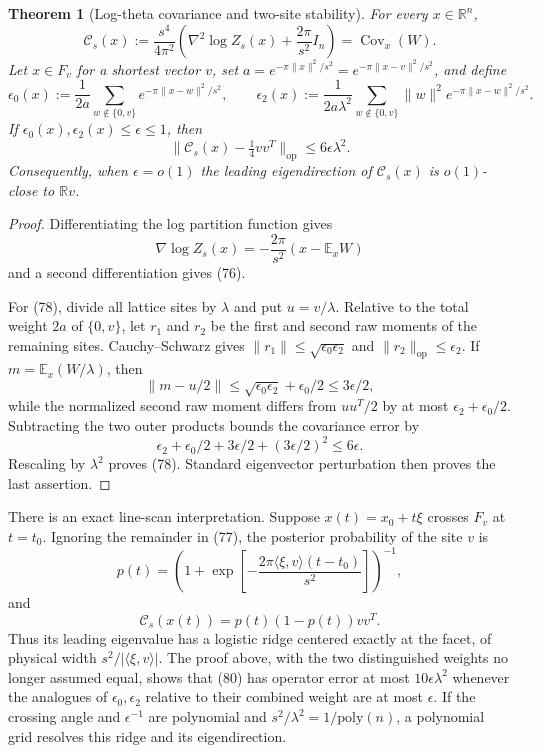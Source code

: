 \documentclass[10pt]{article}
\newtheorem{theorem}{Theorem}[section]
\theoremstyle{definition}
\newcommand{\R}{\mathbb{R}}
\newcommand{\E}{\mathbb{E}}
\newcommand{\op}{\mathrm{op}}
\newcommand{\poly}{\mathrm{poly}}
\newcommand{\ip}[2]{\langle #1,#2\rangle}
\newcommand{\norm}[1]{\lVert #1\rVert}
\begin{document}
\begin{theorem}[Log-theta covariance and two-site stability]
                                                                    \label{thm:log-collision}
For every $x\in\R^n$,
\[
 \mathcal C_s(x):=
 \frac{s^4}{4\pi^2}\left(\nabla^2\log Z_s(x)+\frac{2\pi}{s^2}I_n\right)
 =\operatorname{Cov}_x(W).                                    \tag{76}
\]
Let $x\in F_v$ for a shortest vector $v$, set
$a=e^{-\pi\norm x^2/s^2}=e^{-\pi\norm{x-v}^2/s^2}$, and define
\[
 \epsilon_0(x):=\frac1{2a}
   \sum_{w\notin\{0,v\}}e^{-\pi\norm{x-w}^2/s^2},\qquad
 \epsilon_2(x):=\frac1{2a\lambda^2}
   \sum_{w\notin\{0,v\}}\norm w^2e^{-\pi\norm{x-w}^2/s^2}.      \tag{77}
\]
If $\epsilon_0(x),\epsilon_2(x)\le\epsilon\le1$, then
\[
 \norm{\mathcal C_s(x)-\tfrac14vv^T}_{\op}
 \le6\epsilon\lambda^2.                                       \tag{78}
\]
Consequently, when $\epsilon=o(1)$ the leading eigendirection of
$\mathcal C_s(x)$ is $o(1)$-close to $\R v$.
\end{theorem}

\begin{proof}
Differentiating the log partition function gives
\[
 \nabla\log Z_s(x)=-\frac{2\pi}{s^2}(x-\E_xW)
\]
and a second differentiation gives (76).

For (78), divide all lattice sites by $\lambda$ and put $u=v/\lambda$.
Relative to the total weight $2a$ of $\{0,v\}$, let $r_1$ and $r_2$ be the
first and second raw moments of the remaining sites.  Cauchy--Schwarz gives
$\norm{r_1}\le\sqrt{\epsilon_0\epsilon_2}$ and
$\norm{r_2}_{\op}\le\epsilon_2$.  If $m=\E_x(W/\lambda)$, then
\[
 \norm{m-u/2}\le\sqrt{\epsilon_0\epsilon_2}+\epsilon_0/2
 \le3\epsilon/2,
\]
while the normalized second raw moment differs from $uu^T/2$ by at most
$\epsilon_2+\epsilon_0/2$.  Subtracting the two outer products bounds the
covariance error by
\[
 \epsilon_2+\epsilon_0/2+3\epsilon/2+(3\epsilon/2)^2
 \le6\epsilon.
\]
Rescaling by $\lambda^2$ proves (78).  Standard eigenvector perturbation
then proves the last assertion.
\end{proof}

There is an exact line-scan interpretation.  Suppose
$x(t)=x_0+t\xi$ crosses $F_v$ at $t=t_0$.  Ignoring the remainder in (77),
the posterior probability of the site $v$ is
\[
 p(t)=\left(1+
 \exp\!\left[-\frac{2\pi\ip{\xi}{v}(t-t_0)}{s^2}\right]\right)^{-1},
                                                                    \tag{79}
\]
and
\[
 \mathcal C_s(x(t))=p(t)(1-p(t))vv^T.                           \tag{80}
\]
Thus its leading eigenvalue has a logistic ridge centered exactly at the
facet, of physical width $s^2/|\ip{\xi}{v}|$.  The proof above, with the two
distinguished weights no longer assumed equal, shows that (80) has
operator error at most $10\epsilon\lambda^2$ whenever the analogues of
$\epsilon_0,\epsilon_2$ relative to their combined weight are at most
$\epsilon$.  If the crossing angle and $\epsilon^{-1}$ are polynomial and
$s^2/\lambda^2=1/\poly(n)$, a polynomial grid resolves this ridge and its
eigendirection.
\end{document}
